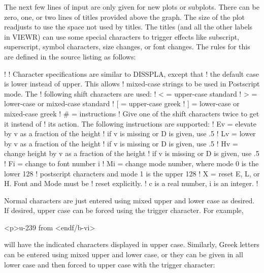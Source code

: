The next few lines of input are only given for new plots or subplots.
There can be zero, one, or two lines of titles provided above the
graph.  The size of the plot readjusts to use the space not used by
titles.  The titles (and all the other labels in VIEWR) can use some
special characters to trigger effects like subscript, superscript,
symbol characters, size changes, or font changes.  The rules for
this are defined in the source listing as follows:

\small
\begin{ccode}

   !
   ! Character specifications are similar to DISSPLA, except that
   ! the default case is lower instead of upper.  This allows
   ! mixed-case strings to be used in Postscript mode.  The
   ! following shift characters are used:
   !     < = upper-case standard
   !     > = lower-case or mixed-case standard
   !     [ = upper-case greek
   !     ] = lower-case or mixed-case greek
   !     # = instructions
   ! Give one of the shift characters twice to get it instead of
   ! its action.  The following instructions are supported:
   !     Ev = elevate by v as a fraction of the height
   !           if v is missing or D is given, use .5
   !     Lv = lower by v as a fraction of the height
   !           if v is missing or D is given, use .5
   !     Hv = change height by v as a fraction of the height
   !           if v is missing or D is given, use .5
   !     Fi = change to font number i
   !     Mi = change mode number, where mode 0 is the lower 128
   !           postscript characters and mode 1 is the upper 128
   !     X  = reset E, L, or H.  Font and Mode must be
   !           reset explicitly.
   !     c is a real number, i is an integer.
   !

\end{ccode}
\normalsize

\noindent
Normal characters are just entered using mixed upper and lower case
as desired.  If desired, upper case can be forced using the trigger
character.  For example,

\small
\begin{ccode}

   <p>u-239 from <endf/b-vi>

\end{ccode}
\normalsize

\noindent
will have the indicated characters displayed in upper case.  Similarly,
Greek letters can be entered using mixed upper and lower case, or they
can be given in all lower case and then forced to upper case with the
trigger character:

